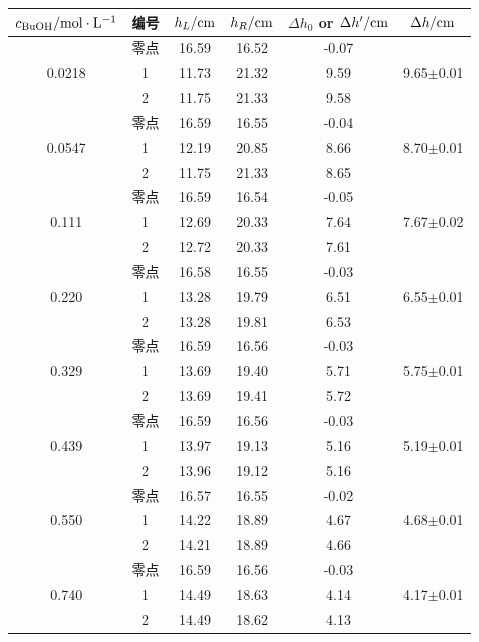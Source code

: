 \documentclass[12pt]{article}
\begin{document}
 \begin{table}[h]
 	\centering
 	\begin{tabular}{cccccc}
 		\toprule
 		$c_{\rm BuOH}/{\rm mol\cdot L^{-1}}$ & 编号 & $h_{L}/{\rm cm}$ & $h_{R}/{\rm cm}$ & $\Delta h_{0}$ or $\Delta h^{\prime}/{\rm cm}$ & $\Delta h/{\rm cm}$  \\
 		\midrule
~      & 零点&16.59 & 16.52 & -0.07 & ~ \\
0.0218 & 1  &11.73 & 21.32 & 9.59 & 9.65$\pm$0.01 \\
~      & 2  &11.75 & 21.33 & 9.58 & \\
 		\midrule
~      & 零点&16.59 & 16.55 & -0.04 & ~ \\
0.0547 & 1  &12.19 & 20.85 & 8.66 & 8.70$\pm$0.01\\
~      & 2  &11.75 & 21.33 & 8.65 & \\
\midrule
~      & 零点&16.59 & 16.54& -0.05 & ~ \\
0.111 & 1  &12.69 & 20.33 & 7.64 & 7.67$\pm$0.02\\
~      & 2  &12.72 & 20.33 & 7.61 & ~ \\
\midrule
~      & 零点&16.58 & 16.55 & -0.03 & ~ \\
0.220 & 1  &13.28 & 19.79 & 6.51 & 6.55$\pm$0.01\\
~      & 2  &13.28 & 19.81 & 6.53 & ~ \\
\midrule
~      & 零点&16.59 & 16.56 & -0.03 & ~ \\
0.329 & 1  &13.69 & 19.40 & 5.71 & 5.75$\pm$0.01\\
~      & 2  &13.69 & 19.41 & 5.72 & \\
\midrule
~      & 零点&16.59 & 16.56 & -0.03 & ~ \\
0.439 & 1  &13.97 & 19.13 & 5.16 & 5.19$\pm$0.01\\
~      & 2  &13.96 & 19.12 & 5.16 & \\
\midrule
~      & 零点&16.57 & 16.55 & -0.02 & ~ \\
0.550 & 1  &14.22 & 18.89 & 4.67 & 4.68$\pm$0.01\\
~      & 2  &14.21 & 18.89 & 4.66 & \\
\midrule
~      & 零点&16.59 & 16.56 & -0.03 & ~ \\
0.740 & 1  &14.49 & 18.63 & 4.14 & 4.17$\pm$0.01\\
~      & 2  &14.49 & 18.62 & 4.13 & \\
 		\bottomrule
 	\end{tabular}
 \end{table}
\par 
 
\end{document}
